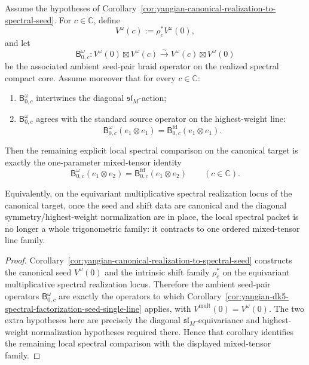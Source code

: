 \begin{corollary}
\label{cor:yangian-canonical-realization-to-single-line}
Assume the hypotheses of
Corollary~\ref{cor:yangian-canonical-realization-to-spectral-seed}.
For \(c\in\mathbb C\), define
\[
V^\omega(c):=\rho_c^*V^\omega(0),
\]
and let
\[
\mathsf B_{0,c}^{\omega}\colon
V^\omega(0)\boxtimes V^\omega(c)
\xrightarrow{\sim}
V^\omega(c)\boxtimes V^\omega(0)
\]
be the associated ambient seed-pair braid operator on the realized
spectral compact core.  Assume moreover that for every \(c\in\mathbb C\):
\begin{enumerate}[label=\textup{(\roman*)}]
\item \(\mathsf B_{0,c}^{\omega}\) intertwines the diagonal
  \(\mathfrak{sl}_M\)-action;
\item \(\mathsf B_{0,c}^{\omega}\) agrees with the standard source
  operator on the highest-weight line:
  \[
  \mathsf B_{0,c}^{\omega}(e_1\otimes e_1)
  =
  \mathsf B_{0,c}^{\mathrm{fd}}(e_1\otimes e_1).
  \]
\end{enumerate}
Then the remaining explicit local spectral comparison on the canonical
target is exactly the one-parameter mixed-tensor identity
\[
\mathsf B_{0,c}^{\omega}(e_1\otimes e_2)
=
\mathsf B_{0,c}^{\mathrm{fd}}(e_1\otimes e_2)
\qquad (c\in\mathbb C).
\]

Equivalently, on the equivariant multiplicative spectral realization
locus of the canonical target, once the seed and shift data are
canonical and the diagonal symmetry/highest-weight normalization are in
place, the local spectral packet is no longer a whole trigonometric
family: it contracts to one ordered mixed-tensor line family.
\end{corollary}

\begin{proof}
Corollary~\ref{cor:yangian-canonical-realization-to-spectral-seed}
constructs the canonical seed \(V^\omega(0)\) and the intrinsic shift
family \(\rho_c^*\) on the equivariant multiplicative spectral
realization locus.  Therefore the ambient seed-pair operators
\(\mathsf B_{0,c}^{\omega}\) are exactly the operators to which
Corollary~\ref{cor:yangian-dk5-spectral-factorization-seed-single-line}
applies, with \(V^{\mathrm{mult}}(0)=V^\omega(0)\).  The two extra
hypotheses here are precisely the diagonal
\(\mathfrak{sl}_M\)-equivariance and highest-weight normalization
hypotheses required there.  Hence that corollary identifies the
remaining local spectral comparison with the displayed mixed-tensor
family.
\end{proof}


